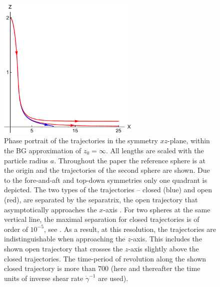%
\begin{figure}[t]
 \centering
\includegraphics[width=0.6\textwidth]{SeparatrixBG.pdf}
\caption{Phase portrait of the trajectories in the symmetry $xz$-plane, within the BG approximation of $z_0=\infty$. All lengths are scaled with the particle radius $a$.
Throughout the paper the reference sphere is at the origin and the trajectories of the second sphere are shown. Due to the fore-and-aft and top-down symmetries only one quadrant is depicted. The two types of the trajectories -- closed (blue) and open (red), are separated by the separatrix, the open trajectory that asymptotically approaches the $x$-axis \citep{lin_lee_sather_1970,batchelor_green_1972}. For two spheres at the same vertical line, the maximal separation for closed trajectories is of order of $10^{-5}$, see \cite{arp}. As a result, at this resolution, the trajectories are indistinguishable when approaching the $z$-axis. This includes the shown open trajectory that crosses the $z$-axis slightly above the closed trajectories. The time-period of revolution along the shown closed trajectory is more than $700$ (here and thereafter the time units of inverse shear rate $\dot{\gamma}^{-1}$ are used).}
\label{fig:SeparatrixBG}
\end{figure}
%
